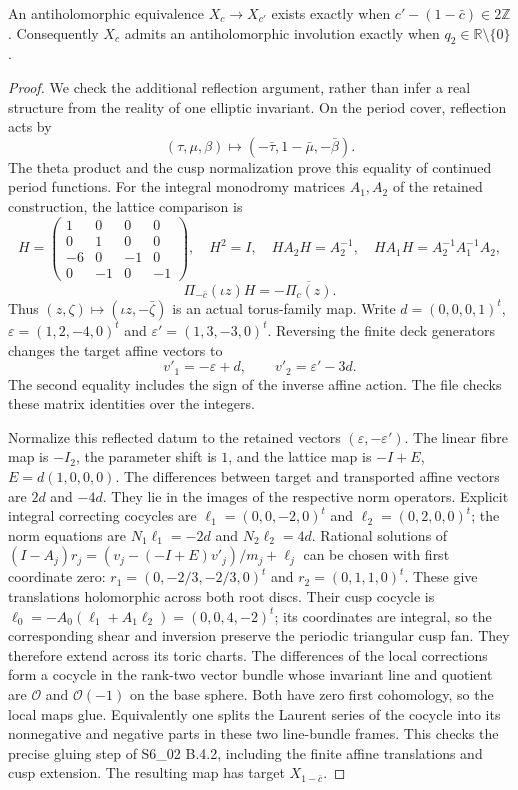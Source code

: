 \begin{proposition}\label{ari:C.2.2}
An antiholomorphic equivalence $X_c\to X_{c'}$ exists exactly when
$c'-(1-\bar c)\in2\mathbb Z$. Consequently $X_c$ admits an
antiholomorphic involution exactly when $q_2\in\mathbb R\setminus\{0\}$.
\end{proposition}
\begin{proof}
We check the additional reflection argument, rather than infer a real
structure from the reality of one elliptic invariant. On the period
cover, reflection acts by
\[
 (\tau,\mu,\beta)\longmapsto(-\bar\tau,1-\bar\mu,-\bar\beta).
\]
The theta product and the cusp normalization prove this equality of
continued period functions. For the integral monodromy matrices
$A_1,A_2$ of the retained construction, the lattice comparison is
\[
 H=\begin{pmatrix}1&0&0&0\\0&1&0&0\\-6&0&-1&0\\0&-1&0&-1\end{pmatrix},
 \quad H^2=I,\quad HA_2H=A_2^{-1},\quad
 HA_1H=A_2^{-1}A_1^{-1}A_2,
\]
\[
 \Pi_{-\bar c}(\iota z)H=-\overline{\Pi_c(z)}.
\]
Thus $(z,\zeta)\mapsto(\iota z,-\bar\zeta)$ is an actual torus-family
map. Write $d=(0,0,0,1)^t$, $\varepsilon=(1,2,-4,0)^t$ and
$\varepsilon'=(1,3,-3,0)^t$. Reversing the finite deck generators
changes the target affine vectors to
\[
 v'_1=-\varepsilon+d,\qquad v'_2=\varepsilon'-3d.
\]
The second equality includes the sign of the inverse affine action.
The file  checks these matrix identities
over the integers.

Normalize this reflected datum to the retained vectors
$(\varepsilon,-\varepsilon')$. The linear fibre map is $-I_2$, the
parameter shift is $1$, and the lattice map is $-I+E$,
$E=d(1,0,0,0)$. The differences between target and transported affine
vectors are $2d$ and $-4d$. They lie in the images of the respective
norm operators. Explicit integral correcting cocycles are
$\ell_1=(0,0,-2,0)^t$ and $\ell_2=(0,2,0,0)^t$; the norm equations
are $N_1\ell_1=-2d$ and $N_2\ell_2=4d$. Rational solutions of
$(I-A_j)r_j=(v_j-(-I+E)v'_j)/m_j+\ell_j$ can be chosen with first
coordinate zero: $r_1=(0,-2/3,-2/3,0)^t$ and
$r_2=(0,1,1,0)^t$. These give translations holomorphic across both
root discs. Their cusp cocycle is
$\ell_0=-A_0(\ell_1+A_1\ell_2)=(0,0,4,-2)^t$; its coordinates are
integral, so the corresponding shear and inversion preserve the
periodic triangular cusp fan. They therefore extend across its toric
charts. The differences of the local corrections form a cocycle in
the rank-two vector bundle whose invariant line and quotient are
$\mathcal O$ and $\mathcal O(-1)$ on the base sphere. Both have zero
first cohomology, so the local maps glue. Equivalently one splits the
Laurent series of the cocycle into its nonnegative and negative
parts in these two line-bundle frames. This checks the precise
gluing step of S6\_02 B.4.2, including the finite affine translations
and cusp extension. The resulting map has target $X_{1-\bar c}$.


\end{proof}
